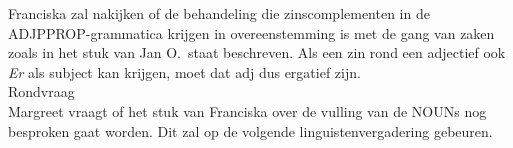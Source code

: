 Franciska zal nakijken of de behandeling die zinscomplementen in de 
ADJPPROP-grammatica krijgen in overeenstemming is met de gang van zaken zoals 
in het stuk van Jan O.\ staat beschreven. Als een zin rond een adjectief ook 
{\em Er\/} als subject kan krijgen, moet dat adj dus ergatief zijn.\\[2 cm]

{\Large Rondvraag}\\
Margreet vraagt of het stuk van Franciska over de vulling van de NOUNs nog 
besproken gaat worden. Dit zal op de volgende linguistenvergadering gebeuren.

